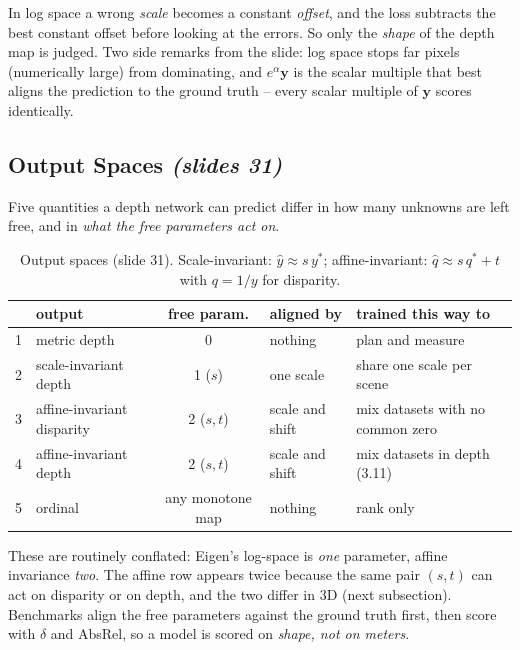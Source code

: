 \documentclass[11pt,a4paper]{article}
\numberwithin{equation}{section}
\newcommand{\slides}[1]{\texorpdfstring{\;\emph{(slides #1)}}{ (slides #1)}}
\theoremstyle{plain}
\theoremstyle{definition}
\begin{document}
\begin{intuition}
In log space a wrong \emph{scale} becomes a constant \emph{offset}, and the loss subtracts the best constant offset before looking at the errors. So only the \emph{shape} of the depth map is judged. Two side remarks from the slide: log space stops far pixels (numerically large) from dominating, and $e^{\alpha}\bm y$ is the scalar multiple that best aligns the prediction to the ground truth -- every scalar multiple of $\bm y$ scores identically.
\end{intuition}
 
\subsection{Output Spaces \slides{31}}
 
Five quantities a depth network can predict differ in how many unknowns are left free, and in \emph{what the free parameters act on}.
 
\begin{table}[htbp]
\centering\small
\begin{tabularx}{\linewidth}{@{}p{0.3cm}Ycp{3.1cm}Y@{}}
\toprule
& output & free param. & aligned by & trained this way to\\
 & metric depth & 0 & nothing & plan and measure\\
2 & scale-invariant depth & 1 ($s$) & one scale & share one scale per scene\\
3 & affine-invariant disparity & 2 ($s,t$) & scale and shift & mix datasets with no common zero\\
4 & affine-invariant depth & 2 ($s,t$) & scale and shift & mix datasets in depth (3.11)\\
5 & ordinal & any monotone map & nothing & rank only\\
\bottomrule
\end{tabularx}
\caption{Output spaces (slide 31). Scale-invariant: $\hat y\approx s\,y^\ast$; affine-invariant: $\hat q\approx s\,q^\ast+t$ with $q=1/y$ for disparity.}
\end{table}
 
These are routinely conflated: Eigen's log-space is \emph{one} parameter, affine invariance \emph{two}. The affine row appears twice because the same pair $(s,t)$ can act on disparity or on depth, and the two differ in 3D (next subsection). Benchmarks align the free parameters against the ground truth first, then score with $\delta$ and AbsRel, so a model is scored on \emph{shape, not on meters}.
 
\end{document}
